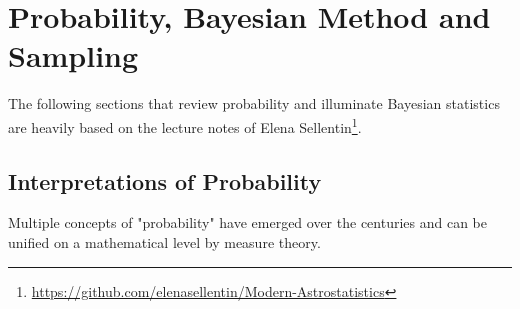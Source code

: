 \clearpage
\chapter{Probability, Bayesian Method and Sampling} \label{app:Bayes}



The following sections that review probability and illuminate Bayesian statistics are heavily based on the lecture notes of Elena Sellentin\footnote{\url{https://github.com/elenasellentin/Modern-Astrostatistics}}.
 
\section{Interpretations of Probability} 
Multiple concepts of "probability" have emerged over the centuries and can be unified on a mathematical level by measure theory.

